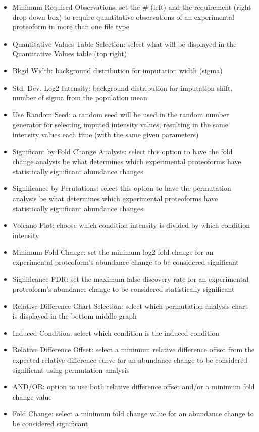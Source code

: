 \begin{itemize}
\item Minimum Required Observations: set the \# (left) and the requirement (right drop down box) to require quantitative observations of an experimental proteoform in more than one file type
\item Quantitative Values Table Selection: select what will be displayed in the Quantitative Values table (top right)
\item Bkgd Width: background distribution for imputation width (sigma)
\item Std. Dev. Log2 Intensity: background distribution for imputation shift, number of sigma from the population mean
\item Use Random Seed: a random seed will be used in the random number generator for selecting imputed intensity values, resulting in the same intensity values each time (with the same given parameters)
\item Significant by Fold Change Analysis: select this option to have the fold change analysis be what determines which experimental proteoforms have statistically significant abundance changes
\item Significance by Perutations: select this option to have the permutation analysis be what determines which experimental proteoforms have statistically significant abundance changes
\item Volcano Plot: choose which condition intensity is divided by which condition intensity
\item Minimum Fold Change: set the minimum log2 fold change for an experimental proteoform's abundance change to be considered significant
\item Significance FDR: set the maximum false discovery rate for an experimental proteoform's abundance change to be considered statistically significant
\item Relative Difference Chart Selection: select which permutation analysis chart is displayed in the bottom middle graph
\item Induced Condition: select which condition is the induced condition
\item Relative Difference Offset: select a minimum relative difference offset from the expected relative difference curve for an abundance change to be considered significant using permutation analysis
\item AND/OR: option to use both relative difference offset and/or a minimum fold change value
\item Fold Change: select a minimum fold change value for an abundance change to be considered significant

\end{itemize}
